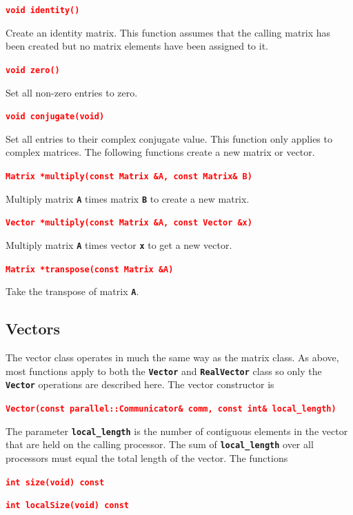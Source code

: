 \documentclass[12pt]{report} %
\begin{document}
\textcolor{red}{\texttt{\textbf{void identity()}}}

Create an identity matrix. This function assumes that the calling matrix has been created but no matrix elements have been assigned to it.

\textcolor{red}{\texttt{\textbf{void zero()}}}

Set all non-zero entries to zero.

\textcolor{red}{\texttt{\textbf{void conjugate(void)}}}

Set all entries to their complex conjugate value. This function only applies to complex matrices.
The following functions create a new matrix or vector.

\textcolor{red}{\texttt{\textbf{Matrix *multiply(const Matrix \&A, const Matrix\& B)}}}

Multiply matrix \texttt{\textbf{A}} times matrix \texttt{\textbf{B}} to create a new matrix.

\textcolor{red}{\texttt{\textbf{Vector *multiply(const Matrix \&A, const Vector \&x)}}}

Multiply matrix \texttt{\textbf{A}} times vector \texttt{\textbf{x}} to get a new vector.

\textcolor{red}{\texttt{\textbf{Matrix *transpose(const Matrix \&A)}}}

Take the transpose of matrix \texttt{\textbf{A}}.

\subsection{Vectors}

The vector class operates in much the same way as the matrix class. As above, most functions apply to both the \texttt{\textbf{Vector}} and \texttt{\textbf{RealVector}} class so only the \texttt{\textbf{Vector}} operations are described here. The vector constructor is

\textcolor{red}{\texttt{\textbf{Vector(const parallel::Communicator\& comm, const int\& local\_length)}}}

The parameter \texttt{\textbf{local\_length}} is the number of contiguous elements in the vector that are held on the calling processor. The sum of \texttt{\textbf{local\_length}} over all processors must equal the total length of the vector. The functions

\textcolor{red}{\texttt{\textbf{int size(void) const}}}

\textcolor{red}{\texttt{\textbf{int localSize(void) const}}}
\end{document}
